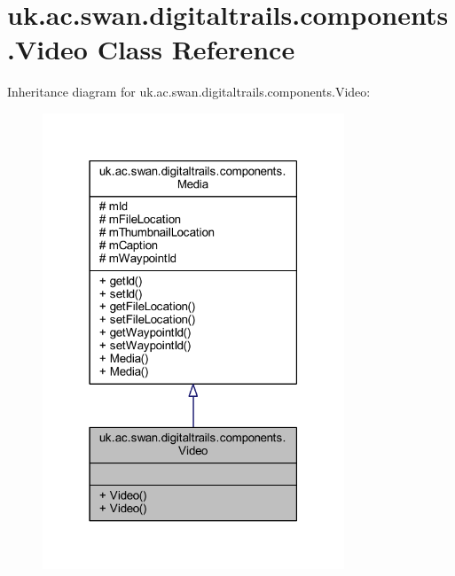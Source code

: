 \hypertarget{classuk_1_1ac_1_1swan_1_1digitaltrails_1_1components_1_1_video}{\section{uk.\+ac.\+swan.\+digitaltrails.\+components.\+Video Class Reference}
\label{classuk_1_1ac_1_1swan_1_1digitaltrails_1_1components_1_1_video}
}


Inheritance diagram for uk.\+ac.\+swan.\+digitaltrails.\+components.\+Video\+:
\nopagebreak
\begin{figure}[H]
\begin{center}
\leavevmode
\includegraphics[width=255pt]{classuk_1_1ac_1_1swan_1_1digitaltrails_1_1components_1_1_video__inherit__graph}
\end{center}
\end{figure}


